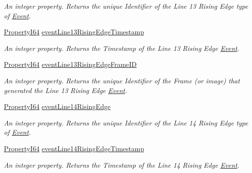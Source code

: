 \begin{DoxyCompactItemize}
\begin{DoxyCompactList}\small\item\em An integer property. Returns the unique Identifier of the Line 13 Rising Edge type of \hyperlink{classmv_i_m_p_a_c_t_1_1acquire_1_1_event}{Event}. \end{DoxyCompactList}\item 
\hyperlink{group___common_interface_ga81749b2696755513663492664a18a893}{Property\+I64} \hyperlink{classmv_i_m_p_a_c_t_1_1acquire_1_1_gen_i_cam_1_1_event_control_a4204be4e87008b8f3124b5245b14af3b}{event\+Line13\+Rising\+Edge\+Timestamp}
\begin{DoxyCompactList}\small\item\em An integer property. Returns the Timestamp of the Line 13 Rising Edge \hyperlink{classmv_i_m_p_a_c_t_1_1acquire_1_1_event}{Event}. \end{DoxyCompactList}\item 
\hyperlink{group___common_interface_ga81749b2696755513663492664a18a893}{Property\+I64} \hyperlink{classmv_i_m_p_a_c_t_1_1acquire_1_1_gen_i_cam_1_1_event_control_addb29007aca17045028c4915f2bdc147}{event\+Line13\+Rising\+Edge\+Frame\+I\+D}
\begin{DoxyCompactList}\small\item\em An integer property. Returns the unique Identifier of the Frame (or image) that generated the Line 13 Rising Edge \hyperlink{classmv_i_m_p_a_c_t_1_1acquire_1_1_event}{Event}. \end{DoxyCompactList}\item 
\hyperlink{group___common_interface_ga81749b2696755513663492664a18a893}{Property\+I64} \hyperlink{classmv_i_m_p_a_c_t_1_1acquire_1_1_gen_i_cam_1_1_event_control_a3ff784b1574c6618ba494109f47ce142}{event\+Line14\+Rising\+Edge}
\begin{DoxyCompactList}\small\item\em An integer property. Returns the unique Identifier of the Line 14 Rising Edge type of \hyperlink{classmv_i_m_p_a_c_t_1_1acquire_1_1_event}{Event}. \end{DoxyCompactList}\item 
\hyperlink{group___common_interface_ga81749b2696755513663492664a18a893}{Property\+I64} \hyperlink{classmv_i_m_p_a_c_t_1_1acquire_1_1_gen_i_cam_1_1_event_control_ac8a9bf0b4f1c5aa8263586b7edf47de6}{event\+Line14\+Rising\+Edge\+Timestamp}
\begin{DoxyCompactList}\small\item\em An integer property. Returns the Timestamp of the Line 14 Rising Edge \hyperlink{classmv_i_m_p_a_c_t_1_1acquire_1_1_event}{Event}. \end{DoxyCompactList}\item 

\end{DoxyCompactItemize}
